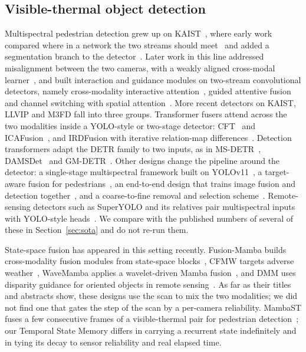 \subsection{Visible-thermal object detection}
Multispectral pedestrian detection grew up on KAIST~\cite{hwang2015kaist}, where early work compared where in a network the two streams should meet~\cite{liu2016halfway} and added a segmentation branch to the detector~\cite{li2018msdsrcnn}. Later work in this line addressed misalignment between the two cameras, with a weakly aligned cross-modal learner~\cite{zhang2019arcnn}, and built interaction and guidance modules on two-stream convolutional detectors, namely cross-modality interactive attention~\cite{zhang2019cian}, guided attentive fusion~\cite{zhang2021gaff} and channel switching with spatial attention~\cite{cao2023csaa}. More recent detectors on KAIST, LLVIP and M3FD fall into three groups. Transformer fusers attend across the two modalities inside a YOLO-style or two-stage detector: CFT~\cite{fang2021cft} and ICAFusion~\cite{shen2024icafusion}, and IRDFusion with iterative relation-map differences~\cite{shen2025irdfusion}. Detection transformers adapt the DETR family to two inputs, as in MS-DETR~\cite{xing2024msdetr}, DAMSDet~\cite{guo2024damsdet} and GM-DETR~\cite{xiao2024gmdetr}. Other designs change the pipeline around the detector: a single-stage multispectral framework built on YOLOv11~\cite{wan2025yolov11rgbt}, a target-aware fusion for pedestrians~\cite{zhang2024tfdet}, an end-to-end design that trains image fusion and detection together~\cite{zhang2024e2emfd}, and a coarse-to-fine removal and selection scheme~\cite{zhao2026rsdet}. Remote-sensing detectors such as SuperYOLO and its relatives pair multispectral inputs with YOLO-style heads~\cite{zhang2023superyolo,fang2022yolofusion}. We compare with the published numbers of several of these in Section~\ref{sec:sota} and do not re-run them.

State-space fusion has appeared in this setting recently. Fusion-Mamba builds cross-modality fusion modules from state-space blocks~\cite{dong2025fusionmamba}, CFMW targets adverse weather~\cite{li2025cfmw}, WaveMamba applies a wavelet-driven Mamba fusion~\cite{zhu2025wavemamba}, and DMM uses disparity guidance for oriented objects in remote sensing~\cite{zhou2024dmm}. As far as their titles and abstracts show, these designs use the scan to mix the two modalities; we did not find one that gates the step of the scan by a per-camera reliability. MambaST fuses a few consecutive frames of a visible-thermal pair for pedestrian detection~\cite{mambast2024}; our Temporal State Memory differs in carrying a recurrent state indefinitely and in tying its decay to sensor reliability and real elapsed time.

